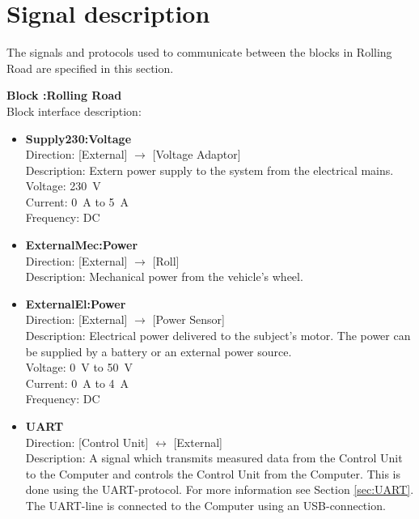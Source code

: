 \section{Signal description}
The signals and protocols used to communicate between the blocks in Rolling Road are specified in this section.

\textbf{Block :Rolling Road}\\
Block interface description:
\begin{itemize}
	\item \textbf{Supply230:Voltage}\\
	Direction: [External] $\rightarrow$ [Voltage Adaptor]\\
	Description: Extern power supply to the system from the electrical mains.\\
	Voltage: \SI{230}{\volt}\\
	Current: \SI{0}{\ampere} to \SI{5}{\ampere}\\
	Frequency: DC
	\item \textbf{ExternalMec:Power}\\
	Direction: [External] $\rightarrow$ [Roll]\\
	Description: Mechanical power from the vehicle's wheel.
	\newpage
	\item \textbf{ExternalEl:Power}\\
	Direction: [External] $\rightarrow$ [Power Sensor]\\
	Description: Electrical power delivered to the subject's motor. The power can be supplied by a battery or an external power source.\\
	Voltage: \SI{0}{\volt} to \SI{50}{\volt}\\
	Current: \SI{0}{\ampere} to \SI{4}{\ampere}\\
	Frequency: DC
	\item \textbf{UART}\\
	Direction: [Control Unit] $\leftrightarrow$ [External]\\
	Description: A signal which transmits measured data from the Control Unit to the Computer and controls the Control Unit from the Computer. This is done using the UART-protocol. For more information see Section \vref{sec:UART}. The UART-line is connected to the Computer using an USB-connection.
\end{itemize}
	
